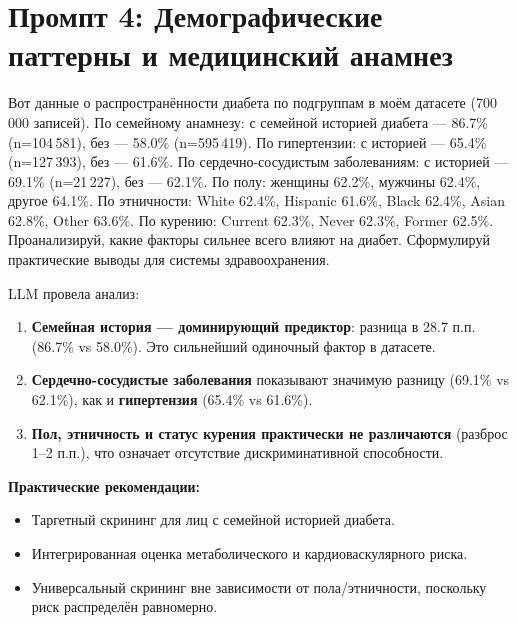 \documentclass[12pt, a4paper]{article}
\begin{document}
\section{Промпт 4: Демографические паттерны и медицинский анамнез}

\begin{promptbox}
Вот данные о распространённости диабета по подгруппам в моём датасете (700\,000 записей). По семейному анамнезу: с семейной историей диабета --- 86.7\% (n=104\,581), без --- 58.0\% (n=595\,419). По гипертензии: с историей --- 65.4\% (n=127\,393), без --- 61.6\%. По сердечно-сосудистым заболеваниям: с историей --- 69.1\% (n=21\,227), без --- 62.1\%. По полу: женщины 62.2\%, мужчины 62.4\%, другое 64.1\%. По этничности: White 62.4\%, Hispanic 61.6\%, Black 62.4\%, Asian 62.8\%, Other 63.6\%. По курению: Current 62.3\%, Never 62.3\%, Former 62.5\%. Проанализируй, какие факторы сильнее всего влияют на диабет. Сформулируй практические выводы для системы здравоохранения.
\end{promptbox}

\begin{responsebox}
LLM провела анализ:

\begin{enumerate}
    \item \textbf{Семейная история --- доминирующий предиктор}: разница в 28.7 п.п. (86.7\% vs 58.0\%). Это сильнейший одиночный фактор в датасете.
    \item \textbf{Сердечно-сосудистые заболевания} показывают значимую разницу (69.1\% vs 62.1\%), как и \textbf{гипертензия} (65.4\% vs 61.6\%).
    \item \textbf{Пол, этничность и статус курения практически не различаются} (разброс 1--2 п.п.), что означает отсутствие дискриминативной способности.
\end{enumerate}

\textbf{Практические рекомендации:}
\begin{itemize}
    \item Таргетный скрининг для лиц с семейной историей диабета.
    \item Интегрированная оценка метаболического и кардиоваскулярного риска.
    \item Универсальный скрининг вне зависимости от пола/этничности, поскольку риск распределён равномерно.
\end{itemize}
\end{responsebox}
\end{document}
